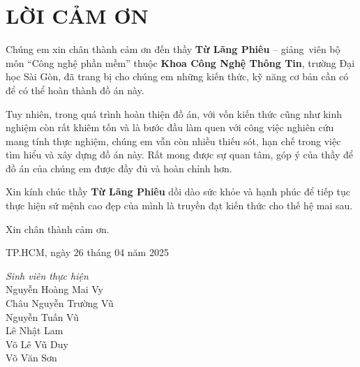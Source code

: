 \documentclass[a4paper]{article}
\begin{document}
\section*{\centering LỜI CẢM ƠN}

\justifying
\quad Chúng em xin chân thành cảm ơn đến thầy \textbf{Từ Lãng Phiêu} – giảng~viên bộ môn “Công nghệ phần mềm” thuộc \textbf{Khoa Công Nghệ Thông Tin}, trường Đại học Sài Gòn, đã trang bị cho chúng em những kiến thức, kỹ năng cơ bản cần có để có thể hoàn thành đồ án này.

\vspace{0.8em}

\quad Tuy nhiên, trong quá trình hoàn thiện đồ án, với vốn kiến thức cũng như kinh nghiệm còn rất khiêm tốn và là bước đầu làm quen với công việc nghiên cứu mang tính thực nghiệm, chúng em vẫn còn nhiều thiếu sót, hạn chế trong việc tìm hiểu và xây dựng đồ án này. Rất mong được sự quan tâm, góp ý của thầy để đồ án của chúng em được đầy đủ và hoàn chỉnh hơn.

\vspace{0.8em}

\quad Xin kính chúc thầy \textbf{Từ Lãng Phiêu} dồi dào sức khỏe và hạnh phúc để tiếp tục thực hiện sứ mệnh cao đẹp của mình là truyền đạt kiến thức cho thế hệ mai sau.

\vspace{0.8em}

\quad Xin chân thành cảm ơn.

\vspace{2em}

\begin{flushright}
    TP.HCM, ngày 26 tháng 04 năm 2025

    \vspace{1em}
    \textit{Sinh viên thực hiện} \\
    \vspace{1em}
    Nguyễn Hoàng Mai Vy\\
    \vspace{0.5em}
    Châu Nguyễn Trường Vũ\\
    \vspace{0.5em}
    Nguyễn Tuấn Vũ\\
    \vspace{0.5em}
    Lê Nhật Lam\\
    \vspace{0.5em}
    Võ Lê Vũ Duy\\
    \vspace{0.5em}
    Võ Văn Sơn
\end{flushright}
\end{document}
